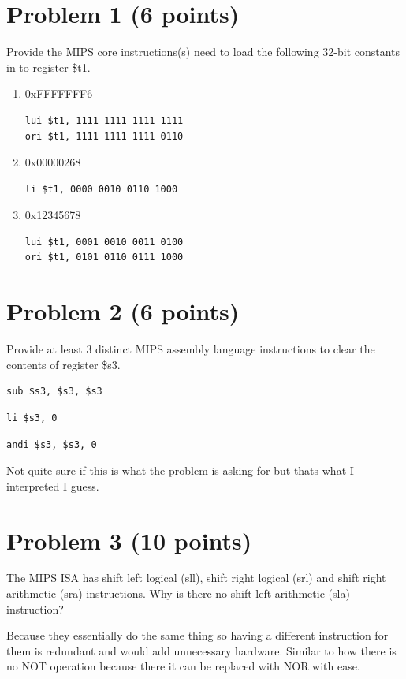 \documentclass{article}
\begin{document}
\section*{Problem 1 (6 points)}
Provide the MIPS core instructions(s) need to load the following 32-bit constants in to register \$t1.
\begin{enumerate}
    \item 0xFFFFFFF6
\begin{verbatim}
lui $t1, 1111 1111 1111 1111
ori $t1, 1111 1111 1111 0110
\end{verbatim}
    \item 0x00000268
\begin{verbatim}
li $t1, 0000 0010 0110 1000 
\end{verbatim}
    \item 0x12345678
\begin{verbatim}
lui $t1, 0001 0010 0011 0100 
ori $t1, 0101 0110 0111 1000
\end{verbatim}
\end{enumerate}
\section*{Problem 2 (6 points)}
Provide at least 3 distinct MIPS assembly language instructions to clear the contents of register \$s3.
\begin{verbatim}
sub $s3, $s3, $s3
\end{verbatim}
\begin{verbatim}
li $s3, 0
\end{verbatim}
\begin{verbatim}
andi $s3, $s3, 0
\end{verbatim}
\begin{center}
    Not quite sure if this is what the problem is asking for but thats what I interpreted I guess.
\end{center}
\section*{Problem 3 (10 points)}
The MIPS ISA has shift left logical (sll), shift right logical (srl) and shift right arithmetic (sra) instructions. Why is there no shift left arithmetic (sla) instruction?
\begin{center}
    Because they essentially do the same thing so having a different instruction for them is redundant and would add unnecessary hardware. Similar to how there is no NOT operation because there it can be replaced with NOR with ease.
\end{center}
\end{document}

